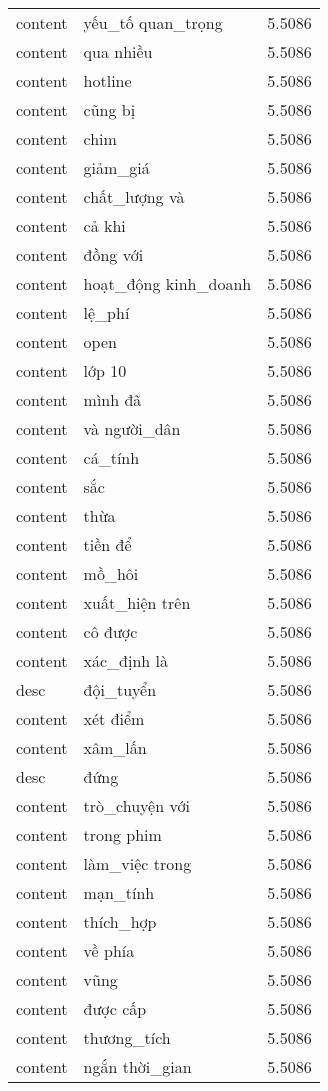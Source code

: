 \documentclass{article}
\begin{document}
\begin{tabular}{lll}
content & yếu\_tố quan\_trọng & 5.5086\\
content & qua nhiều & 5.5086\\
content & hotline & 5.5086\\
content & cũng bị & 5.5086\\
content & chim & 5.5086\\
content & giảm\_giá & 5.5086\\
content & chất\_lượng và & 5.5086\\
content & cả khi & 5.5086\\
content & đồng với & 5.5086\\
content & hoạt\_động kinh\_doanh & 5.5086\\
content & lệ\_phí & 5.5086\\
content & open & 5.5086\\
content & lớp 10 & 5.5086\\
content & mình đã & 5.5086\\
content & và người\_dân & 5.5086\\
content & cá\_tính & 5.5086\\
content & sắc & 5.5086\\
content & thừa & 5.5086\\
content & tiền để & 5.5086\\
content & mồ\_hôi & 5.5086\\
content & xuất\_hiện trên & 5.5086\\
content & cô được & 5.5086\\
content & xác\_định là & 5.5086\\
desc & đội\_tuyển & 5.5086\\
content & xét điểm & 5.5086\\
content & xâm\_lấn & 5.5086\\
desc & đứng & 5.5086\\
content & trò\_chuyện với & 5.5086\\
content & trong phim & 5.5086\\
content & làm\_việc trong & 5.5086\\
content & mạn\_tính & 5.5086\\
content & thích\_hợp & 5.5086\\
content & về phía & 5.5086\\
content & vũng & 5.5086\\
content & được cấp & 5.5086\\
content & thương\_tích & 5.5086\\
content & ngắn thời\_gian & 5.5086\\

\end{tabular}
\end{document}
